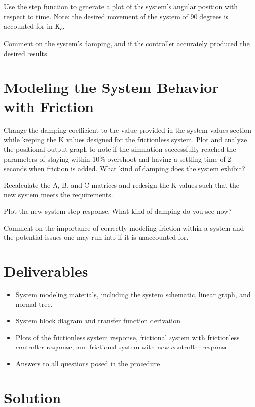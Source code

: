 \documentclass{homework}
\begin{document}
\question Use the step function to generate a plot of the system's angular position with respect to time. Note: the desired movement of the system of 90 degrees is accounted for in K\textsubscript{c}.

\question Comment on the system's damping, and if the controller accurately produced the desired results. 

\section*{Modeling the System Behavior with Friction}
\question Change the damping coefficient to the value provided in the system values section while keeping the K values designed for the frictionless system. Plot and analyze the positional output graph to note if the simulation successfully reached the parameters of staying within 10\% overshoot and having a settling time of 2 seconds when friction is added. What kind of damping does the system exhibit?

\question Recalculate the A, B, and C matrices and redesign the K values such that the new system meets the requirements. 

\question Plot the new system step response. What kind of damping do you see now? 

\question Comment on the importance of correctly modeling friction within a system and the potential issues one may run into if it is unaccounted for. 

\section*{Deliverables}

\begin{itemize}
  \item System modeling materials, including the system schematic, linear graph, and normal tree. 
  \item System block diagram and transfer function derivation 
  \item Plots of the frictionless system response, frictional system with frictionless controller response, and frictional system with new controller response
  \item Answers to all questions posed in the procedure
\end{itemize}
\newpage
\section*{Solution}
\end{document}
